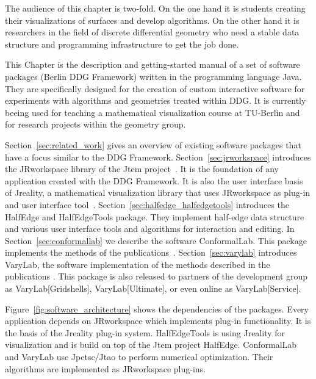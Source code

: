 \documentclass[Thesis.tex]{subfiles}
\begin{document}
The audience of this chapter is two-fold. On the one hand it is students creating their 
visualizations of surfaces and develop algorithms. On the other hand it is researchers in the
field of discrete differential geometry who need a stable data structure and programming
infrastructure to get the job done.

This Chapter is the description and getting-started manual of a set of software packages
(Berlin DDG Framework) written in the programming language {\sc Java}. They are 
specifically designed for the creation of
custom interactive software for experiments with algorithms and geometries treated 
within DDG. It is currently beeing used for teaching a mathematical visualization course at 
TU-Berlin \cite{VisMathHomepage} and for research projects within the geometry group.

Section~\ref{sec:related_work} gives an overview of existing software packages that have a focus 
similar to the DDG Framework. Section~\ref{sec:jrworkspace} introduces the {\sc JRworkspace} library of the 
{\sc Jtem} project~\cite{JtemWebsite}. It is the foundation of any application created with 
the DDG Framework. It is also the user interface basis of {\sc Jreality}, a mathematical 
visualization library that uses {\sc JRworkspace} as plug-in and user interface 
tool~\cite{JrealityWebsite}. Section~\ref{sec:halfedge_halfedgetools} introduces the 
{\sc HalfEdge} and {\sc HalfEdgeTools} package. They implement half-edge data 
structure and various user interface tools and algorithms for interaction and editing.  
In Section~\ref{sec:conformallab} we describe the software 
{\sc ConformalLab}. This package implements the methods of the 
publications~\cite{Bobenko2010, OWR2012, Sechelmann2012, BobSechSpr}.
Section~\ref{sec:varylab} introduces {\sc VaryLab}, the software implementation of the 
methods described in the publications \cite{Lafuente2011, Lafuente2012, Sechelmann2012}.
This package is also released to partners of the development group as {\sc VaryLab[Gridshells]},
{\sc VaryLab[Ultimate]}, or even online as {\sc VaryLab[Service]}\cite{varylab-web-page}.

Figure~\ref{fig:software_architecture} shows the dependencies of the packages. Every
application depends on {\sc JRworkspace} which implements plug-in functionality. It is
the basis of the {\sc Jreality} plug-in system. {\sc Half\-Edge\-Tools} is using {\sc Jreality} 
for visualization and is build on top of the {\sc Jtem} project {\sc Half\-Edge}. 
{\sc ConformalLab} and {\sc VaryLab} use {\sc Jpetsc/Jtao} to perform numerical
optimization. Their algorithms are implemented as {\sc JRworkspace} plug-ins.
\end{document}
